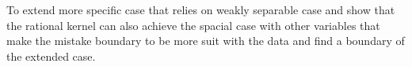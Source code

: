 \justify


To extend more specific case that relies on weakly separable case 
and show that the rational kernel can also achieve the spacial case with other variables that make
the mistake boundary to be more suit with the data and find a boundary of the extended case.
